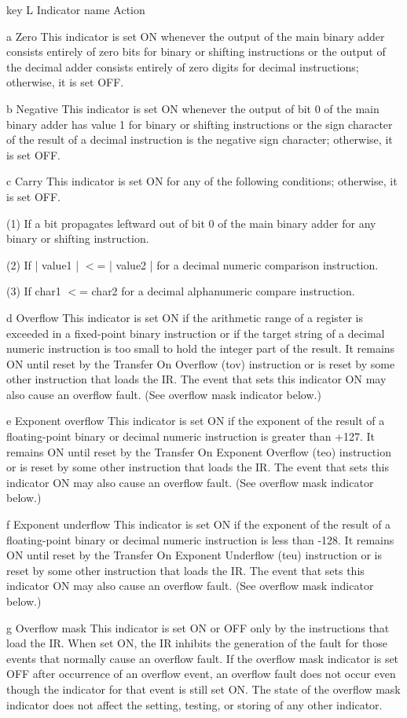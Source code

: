 key L Indicator name Action

a Zero This indicator is set ON whenever the output of the main binary adder
consists entirely of zero bits for binary or shifting instructions or the
output of the decimal adder consists entirely of zero digits for decimal
instructions; otherwise, it is set OFF.

b Negative This indicator is set ON whenever the output of bit 0 of the main
binary adder has value 1 for binary or shifting instructions or the sign
character of the result of a decimal instruction is the negative sign
character; otherwise, it is set OFF.

c Carry This indicator is set ON for any of the following conditions;
otherwise, it is set OFF.


(1) If a bit propagates leftward out of bit 0 of the main binary adder for any
binary or shifting instruction.

(2) If | value1 | $<$= | value2 | for a decimal numeric comparison instruction.

(3) If char1 $<$= char2 for a decimal alphanumeric compare instruction.

d Overflow This indicator is set ON if the arithmetic range of a register is
exceeded in a fixed-point binary instruction or if the target string of a
decimal numeric instruction is too small to hold the integer part of the
result. It remains ON until reset by the Transfer On Overflow (tov) instruction
or is reset by some other instruction that loads the IR. The event that sets
this indicator ON may also cause an overflow fault. (See overflow mask
indicator below.)

e Exponent overflow This indicator is set ON if the exponent of the result of a
floating-point binary or decimal numeric instruction is greater than +127. It
remains ON until reset by the Transfer On Exponent Overflow (teo) instruction
or is reset by some other instruction that loads the IR. The event that sets
this indicator ON may also cause an overflow fault. (See overflow mask
indicator below.)

f Exponent underflow This indicator is set ON if the exponent of the result of
a floating-point binary or decimal numeric instruction is less than -128. It
remains ON until reset by the Transfer On Exponent Underflow (teu) instruction
or is reset by some other instruction that loads the IR. The event that sets
this indicator ON may also cause an overflow fault. (See overflow mask
indicator below.)

g Overflow mask This indicator is set ON or OFF only by the instructions that
load the IR. When set ON, the IR inhibits the generation of the fault for those
events that normally cause an overflow fault. If the overflow mask indicator is
set OFF after occurrence of an overflow event, an overflow fault does not occur
even though the indicator for that event is still set ON. The state of the
overflow mask indicator does not affect the setting, testing, or storing of any
other indicator.


